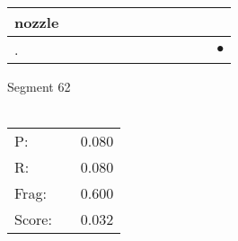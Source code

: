 \documentclass[landscape]{article}
\newcommand{\ssp}{\hspace{2pt}}
\newcommand{\mex}{\cellcolor{g}$\bullet$}
\begin{document}
\begin{tabular}{|l|p{10pt}|p{10pt}|p{10pt}|p{10pt}|p{10pt}|p{10pt}|p{10pt}|p{10pt}|p{10pt}|p{10pt}|p{10pt}|}
\hline
\ssp nozzle \ssp&\hspace{2pt}&\hspace{2pt}&\hspace{2pt}&\hspace{2pt}&\hspace{2pt}&\hspace{2pt}&\hspace{2pt}&\hspace{2pt}&\hspace{2pt}&\hspace{2pt}&\hspace{2pt}\\
\hline
\ssp \cellcolor{ref10}. \ssp&\hspace{2pt}&\hspace{2pt}&\hspace{2pt}&\hspace{2pt}&\hspace{2pt}&\hspace{2pt}&\hspace{2pt}&\hspace{2pt}&\hspace{2pt}&\hspace{2pt}&\hspace{2pt}\mex\\
\hline
\end{tabular}

\vspace{6pt}
\noindent Segment 62\\\\
\noindent\begin{tabular}{lm{12pt}r}
\hline
P:&&0.080\\
R:&&0.080\\
Frag:&&0.600\\
Score:&&0.032\\
\end{tabular}

\newpage
\end{document}
